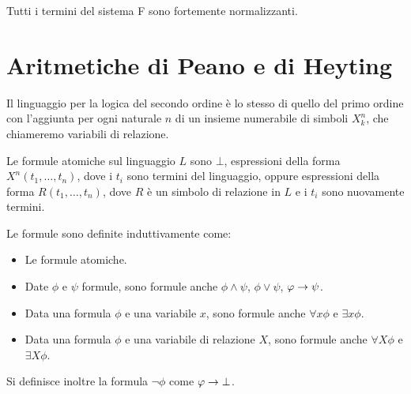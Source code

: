 \documentclass[]{marticle}
\begin{document}
\begin{block} [Teorema]
    Tutti i termini del sistema F sono fortemente normalizzanti.
\end{block}


\section{Aritmetiche di Peano e di Heyting}

\begin{block}[Definizione]
    Il linguaggio per la logica del secondo ordine \`e lo stesso di quello del
    primo ordine con l'aggiunta per ogni naturale $n$ di un insieme numerabile
    di simboli $X_k^n$, che chiameremo variabili di relazione.  
    
    Le formule atomiche sul linguaggio $L$ sono $\bot$, espressioni della forma
    $X^n(t_1, \dots, t_n)$, dove i $t_i$ sono termini del linguaggio, oppure
    espressioni della forma $R(t_1, \dots, t_n)$, dove $R$ \`e un simbolo di
    relazione in $L$ e i $t_i$ sono nuovamente termini.

    Le formule sono definite induttivamente come:
    \begin{itemize}
        \item Le formule atomiche.
        \item Date $\phi$ e $\psi$ formule, sono formule anche $\phi \land
            \psi$, $\phi \lor \psi$, $\varphi \rightarrow \psi$.
        \item Data una formula $\phi$ e una variabile $x$, sono formule anche
            $\forall x \phi$ e $\exists x \phi$.
        \item Data una formula $\phi$ e una variabile di relazione $X$, sono
            formule anche $\forall X \phi$ e $\exists X \phi$.
    \end{itemize}
    Si definisce inoltre la formula $\lnot \phi$ come $\varphi \rightarrow \bot$.
\end{block} 
\end{document}
